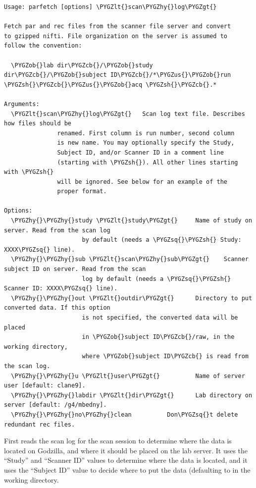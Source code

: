 \documentclass[letterpaper,10pt,openany,oneside]{sphinxmanual}
\def\PYGZus{\char`\_}
\def\PYGZob{\char`\{}
\def\PYGZcb{\char`\}}
\def\PYGZlt{\char`\<}
\def\PYGZgt{\char`\>}
\def\PYGZsh{\char`\#}
\def\PYGZhy{\char`\-}
\def\PYGZsq{\char`\'}
\renewcommand\PYGZsq{\textquotesingle}
\begin{document}
\begin{Verbatim}[commandchars=\\\{\}]
Usage: parfetch [options] \PYGZlt{}scan\PYGZhy{}log\PYGZgt{}

Fetch par and rec files from the scanner file server and convert
to gzipped nifti. File organization on the server is assumed to
follow the convention:

  \PYGZob{}lab dir\PYGZcb{}/\PYGZob{}study dir\PYGZcb{}/\PYGZob{}subject ID\PYGZcb{}/*\PYGZus{}\PYGZob{}run \PYGZsh{}\PYGZcb{}\PYGZus{}\PYGZob{}acq \PYGZsh{}\PYGZcb{}.*

Arguments:
  \PYGZlt{}scan\PYGZhy{}log\PYGZgt{}   Scan log text file. Describes how files should be
               renamed. First column is run number, second column
               is new name. You may optionally specify the Study,
               Subject ID, and/or Scanner ID in a comment line
               (starting with \PYGZsh{}). All other lines starting with \PYGZsh{}
               will be ignored. See below for an example of the
               proper format.

Options:
  \PYGZhy{}\PYGZhy{}study \PYGZlt{}study\PYGZgt{}     Name of study on server. Read from the scan log
                      by default (needs a \PYGZsq{}\PYGZsh{} Study: XXXX\PYGZsq{} line).
  \PYGZhy{}\PYGZhy{}sub \PYGZlt{}scan\PYGZhy{}sub\PYGZgt{}    Scanner subject ID on server. Read from the scan
                      log by default (needs a \PYGZsq{}\PYGZsh{} Scanner ID: XXXX\PYGZsq{} line).
  \PYGZhy{}\PYGZhy{}out \PYGZlt{}outdir\PYGZgt{}      Directory to put converted data. If this option
                      is not specified, the converted data will be placed
                      in \PYGZob{}subject ID\PYGZcb{}/raw, in the working directory,
                      where \PYGZob{}subject ID\PYGZcb{} is read from the scan log.
  \PYGZhy{}\PYGZhy{}u \PYGZlt{}user\PYGZgt{}          Name of server user [default: clane9].
  \PYGZhy{}\PYGZhy{}labdir \PYGZlt{}dir\PYGZgt{}      Lab directory on server [default: /g4/mbedny].
  \PYGZhy{}\PYGZhy{}no\PYGZhy{}clean          Don\PYGZsq{}t delete redundant rec files.
\end{Verbatim}

First  reads the scan log for the scan session to determine where
the data is located on Godzilla, and where it should be placed on the lab
server. It uses the ``Study'' and ``Scanner ID'' values to determine where the data
is located, and it uses the ``Subject ID'' value to decide where to put the data
(defaulting to  in the working directory.
\end{document}
